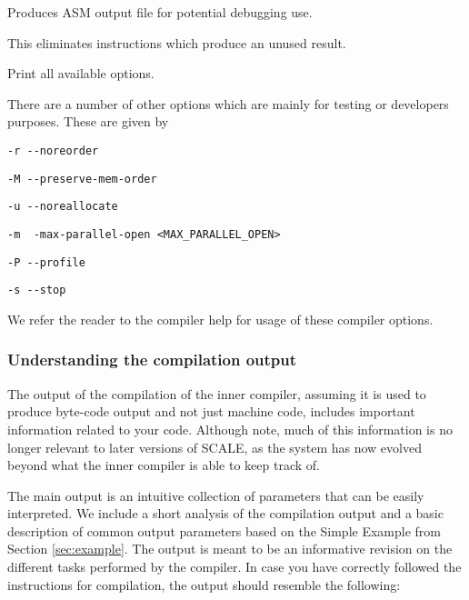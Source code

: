 Produces ASM output file for potential debugging use.

This eliminates instructions which produce an unused result.

Print all available options.

\vspace{5mm}
\noindent
There are a number of other options which are mainly for testing
or developers purposes. These are given by
\begin{description}
	\item \verb|-r --noreorder|
	\item \verb|-M --preserve-mem-order|
	\item \verb|-u --noreallocate|
	\item \verb|-m  -max-parallel-open <MAX_PARALLEL_OPEN>|
	\item \verb|-P --profile|
	\item \verb|-s --stop|
\end{description}
We refer the reader to the compiler help for usage of these compiler options.

\subsubsection{Understanding the compilation output}
The output of the compilation of the inner compiler, assuming it is used to produce byte-code output
and not just machine code, includes important information related to your code.
Although note, much of this information is no longer relevant to later versions of
SCALE, as the system has now evolved beyond what the inner compiler is able to
keep track of.

The main output is an intuitive collection of parameters that can be easily interpreted.
We include a short analysis of the compilation output and a basic description of common
output parameters based on the Simple Example from  Section \ref{sec:example}.
The output is meant to be an informative revision on the different tasks performed by
the compiler. In case you have correctly followed the instructions for compilation,
the output should resemble the following:

